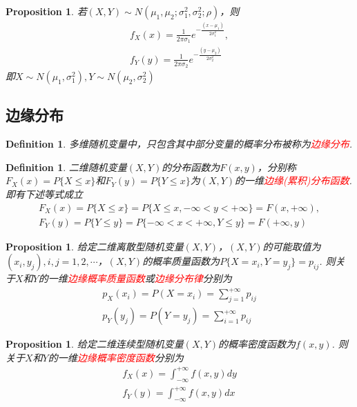 \documentclass{article}
\newtheorem{proposition}[theorem]{Proposition}
\newtheorem{definition}[theorem]{Definition}
\newcommand{\redt}[1]{\textcolor{red}{#1}}
\begin{document}
\begin{proposition}
\rm 若$(X,Y) \sim N(\mu_1,\mu_2;\sigma_1^2,\sigma_2^2; \rho)$，则
$$
\begin{array}{ll}
f_X(x) = \frac{1}{2\pi\sigma_1}e^{-\frac{(x-\mu_1)}{2\sigma_1^2}}, \\
f_Y(y) = \frac{1}{2\pi\sigma_2}e^{-\frac{(y-\mu_2)}{2\sigma_2^2}}
\end{array}
$$
即$X \sim N(\mu_1,\sigma_1^2),Y \sim N(\mu_2,\sigma_2^2)$
\end{proposition}


\subsection{边缘分布}

\begin{definition}
\rm 多维随机变量中，只包含其中部分变量的概率分布被称为\redt{边缘分布}.
\end{definition}

\begin{definition}
\rm 二维随机变量$(X,Y)$的分布函数为$F(x,y)$，分别称$F_X(x)=P\{X \leq x\}$和$F_Y(y) = P\{Y \leq x\}$为$(X,Y)$的一维\redt{边缘(累积)分布函数}. 即有下述等式成立
$$
\begin{array}{ll}
F_X(x) = P\{X \leq x\} = P\{X \leq x,  -\infty < y < +\infty\} = F(x,+\infty),\\
F_Y(y) = P\{Y \leq y\} = P\{-\infty < x < +\infty, Y \leq y\} = F(+\infty,y)
\end{array}
$$
\end{definition}

\begin{proposition}
\rm 给定二维离散型随机变量$(X,Y)$，$(X,Y)$的可能取值为$(x_i,y_j), i,j =1,2,\cdots$，$(X,Y)$的概率质量函数为$P\{X = x_i,Y = y_j\}=p_{ij}$. 则关于$X$和$Y$的一维\redt{边缘概率质量函数}或\redt{边缘分布律}分别为
$$
\begin{array}{ll}
p_X(x_i) = P(X=x_i) = \sum\limits_{j=1}^{+\infty}p_{ij} \\
p_Y(y_j) = P(Y=y_j) = \sum\limits_{i=1}^{+\infty}p_{ij}  
\end{array}
$$
\end{proposition}

\begin{proposition}
\rm 给定二维连续型随机变量$(X,Y)$的概率密度函数为$f(x,y)$. 则关于$X$和$Y$的一维\redt{边缘概率密度函数}分别为
$$
\begin{array}{ll}
f_X(x) = \int_{-\infty}^{+\infty}f(x,y)dy \\
f_Y(y) = \int_{-\infty}^{+\infty}f(x,y)dx
\end{array}
$$
\end{proposition}
\end{document}
